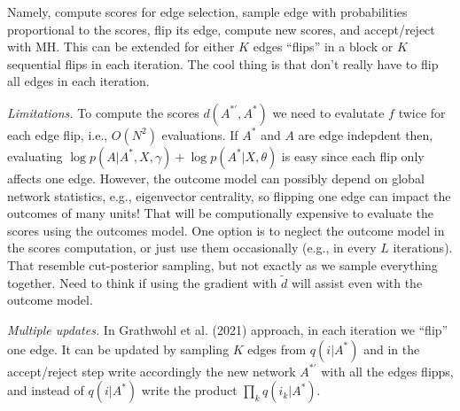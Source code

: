 \documentclass[12pt]{article}
\begin{document}
\begin{enumerate}
            Namely, compute scores for edge selection, sample edge with probabilities
            proportional to the scores, flip its edge, compute new scores,
             and accept/reject with MH. 
             This can be extended for either $K$ edges ``flips'' in a block 
             or $K$ sequential flips in each iteration. 
             The cool thing is that don't really have to flip all edges
             in each iteration.

            \textit{Limitations.} To compute the scores $d(A^{\ast'},A^\ast)$ 
            we need to evalutate $f$ twice for each edge flip, i.e., $O(N^2)$ evaluations.
            If $A^\ast$ and $A$ are edge indepdent then, evaluating 
            $\log p(A \vert A^\ast, X,\gamma) + \log p(A^\ast \vert X,\theta)$ is easy
            since each flip only affects one edge. 
            However, the outcome model can possibly depend on global network statistics,
            e.g., eigenvector centrality, so flipping one edge can impact the outcomes of many units!
            That will be computionally expensive to evaluate the scores using the outcomes model.
            One option is to neglect the outcome model in the scores computation, 
            or just use them occasionally (e.g., in every $L$ iterations). 
            That resemble cut-posterior sampling, but not exactly as we sample everything together.
            Need to think if using the gradient with $\widetilde{d}$ will assist even with the outcome model.

            \textit{Multiple updates.} In Grathwohl et al. (2021) approach, in each iteration we ``flip'' one edge.
            It can be updated by sampling $K$ edges from $q(i\vert A^\ast)$ and
            in the accept/reject step write accordingly the new network $A^{\ast'}$ 
            with all the edges flipps, and instead of $q(i \vert A^\ast)$ write
            the product $\prod_k q(i_k \vert A^\ast)$.


\end{enumerate}
\end{document}
